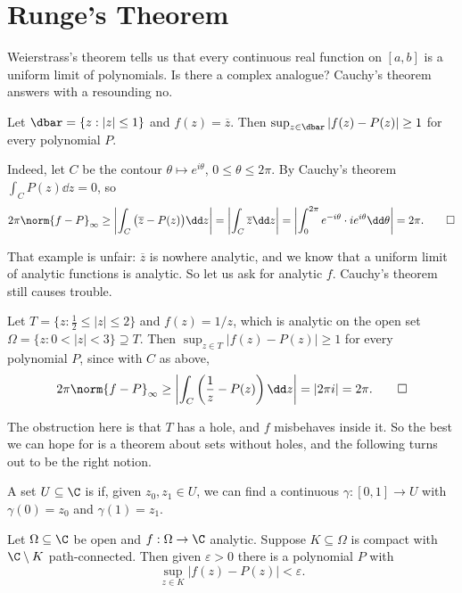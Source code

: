 \section{Runge's Theorem}

Weierstrass's theorem tells us that every continuous real function on $[a,b]$ is a uniform limit of polynomials. Is there a complex analogue? Cauchy's theorem answers with a resounding no.

\begin{example}\label{ex:zbar}
	Let $\dbar = \{z : |z|\leq1\}$ and $f(z) = \overline z$. Then $\sup_{z\in\dbar}|f(z)-P(z)|\geq1$ for every polynomial $P$.

	Indeed, let $C$ be the contour $\theta\mapsto e^{i\theta}$, $0\leq\theta\leq2\pi$. By Cauchy's theorem $\int_C P(z)\dd z = 0$, so
	$$2\pi\norm{f-P}_\infty \geq \left|\int_C\big(\overline z - P(z)\big)\dd z\right| = \left|\int_C\overline z\dd z\right| = \left|\int_0^{2\pi}e^{-i\theta}\cdot ie^{i\theta}\dd\theta\right| = 2\pi. \qedhere$$
\end{example}

That example is unfair: $\overline z$ is nowhere analytic, and we know that a uniform limit of analytic functions is analytic. So let us ask for analytic $f$. Cauchy's theorem still causes trouble.

\begin{example}\label{ex:oneoverz}
	Let $T = \{z : \tfrac12\leq|z|\leq2\}$ and $f(z) = 1/z$, which is analytic on the open set $\Omega = \{z : 0<|z|<3\}\supseteq T$. Then $\sup_{z\in T}|f(z)-P(z)|\geq1$ for every polynomial $P$, since with $C$ as above,
	$$2\pi\norm{f-P}_\infty\geq\left|\int_C\left(\frac1z - P(z)\right)\dd z\right| = |2\pi i| = 2\pi. \qedhere$$
\end{example}

The obstruction here is that $T$ has a hole, and $f$ misbehaves inside it. So the best we can hope for is a theorem about sets without holes, and the following turns out to be the right notion.

\begin{definition}
	A set $U\subseteq\C$ is  if, given $z_0,z_1\in U$, we can find a continuous $\gamma : [0,1]\to U$ with $\gamma(0)=z_0$ and $\gamma(1)=z_1$.
\end{definition}

\begin{theorem}[Runge]\label{thm:runge}
	Let $\Omega\subseteq\C$ be open and $f : \Omega\to\C$ analytic. Suppose $K\subseteq\Omega$ is compact with $\C\setminus K$ path-connected. Then given $\varepsilon>0$ there is a polynomial $P$ with
	$$\sup_{z\in K}|f(z)-P(z)|<\varepsilon.$$
\end{theorem}

